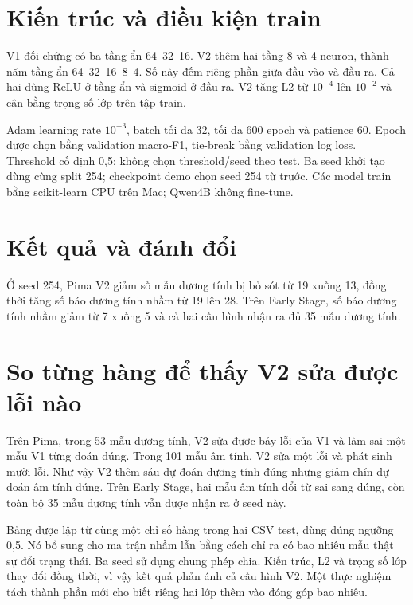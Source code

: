 \section{Kiến trúc và điều kiện train}
V1 đối chứng có ba tầng ẩn 64--32--16. V2 thêm hai tầng 8 và 4 neuron, thành năm tầng ẩn 64--32--16--8--4. Số này đếm riêng phần giữa đầu vào và đầu ra. Cả hai dùng ReLU ở tầng ẩn và sigmoid ở đầu ra. V2 tăng L2 từ $10^{-4}$ lên $10^{-2}$ và cân bằng trọng số lớp trên tập train.

Adam learning rate $10^{-3}$, batch tối đa 32, tối đa 600 epoch và patience 60. Epoch được chọn bằng validation macro-F1, tie-break bằng validation log loss. Threshold cố định 0,5; không chọn threshold/seed theo test. Ba seed khởi tạo dùng cùng split 254; checkpoint demo chọn seed 254 từ trước. Các model train bằng scikit-learn CPU trên Mac; Qwen4B không fine-tune.

\section{Kết quả và đánh đổi}



Ở seed 254, Pima V2 giảm số mẫu dương tính bị bỏ sót từ 19 xuống 13, đồng thời tăng số báo dương tính nhầm từ 19 lên 28. Trên Early Stage, số báo dương tính nhầm giảm từ 7 xuống 5 và cả hai cấu hình nhận ra đủ 35 mẫu dương tính.

\section{So từng hàng để thấy V2 sửa được lỗi nào}

Trên Pima, trong 53 mẫu dương tính, V2 sửa được bảy lỗi của V1 và làm sai một mẫu V1 từng đoán đúng. Trong 101 mẫu âm tính, V2 sửa một lỗi và phát sinh mười lỗi. Như vậy V2 thêm sáu dự đoán dương tính đúng nhưng giảm chín dự đoán âm tính đúng. Trên Early Stage, hai mẫu âm tính đổi từ sai sang đúng, còn toàn bộ 35 mẫu dương tính vẫn được nhận ra ở seed này.

Bảng được lập từ cùng một chỉ số hàng trong hai CSV test, dùng đúng ngưỡng 0,5. Nó bổ sung cho ma trận nhầm lẫn bằng cách chỉ ra có bao nhiêu mẫu thật sự đổi trạng thái. Ba seed sử dụng chung phép chia. Kiến trúc, L2 và trọng số lớp thay đổi đồng thời, vì vậy kết quả phản ánh cả cấu hình V2. Một thực nghiệm tách thành phần mới cho biết riêng hai lớp thêm vào đóng góp bao nhiêu.

